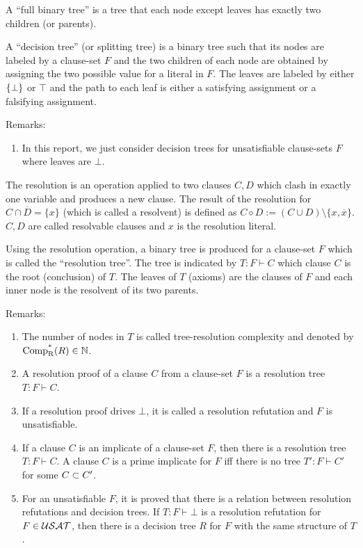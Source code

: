 \documentclass{report}
\begin{document}
A ``full binary tree'' is a tree that each node except leaves has exactly two children (or parents). 
\begin{defi}\label{def:decs-tree}
A ``decision tree'' (or splitting tree) is a binary tree such that its nodes are labeled by a clause-set $F$ and the two children of each node are obtained by assigning the two possible value for a literal in $F$. The leaves are labeled by either $\{ \bot \}$ or $\top$ and the path to each leaf is either a satisfying assignment or a falsifying assignment.
\end{defi}
Remarks:
  \begin{enumerate}
  \item  In this report, we just consider decision trees for unsatisfiable clause-sets $F$ where leaves are $\bot$.
  \end{enumerate}

\begin{defi}\label{def:resolution}
The resolution is an operation applied to two clauses $C,D$ which clash in exactly one variable and produces a new clause. The result of the resolution for $C \cap \overline D = \{ x \}$ (which is called a resolvent) is defined as $C \diamond D := (C \cup D) \setminus \{x, \overline x\} $. $C,D$ are called resolvable clauses and $x$ is the resolution literal. 
\end{defi}
\begin{defi}\label{def:resolution-tree}
Using the resolution operation, a binary tree is produced for a clause-set $F$ which is called the ``resolution tree''. The tree is indicated by $T : F \vdash C$ which clause $C$ is the root (conclusion) of $T$. The leaves of $T$ (axioms) are the clauses of $F$ and each inner node is the resolvent of its two parents. 
\end{defi}
Remarks:
  \begin{enumerate}
  \item  The number of nodes in $T$ is called tree-resolution complexity and denoted by $\operatorname{\operatorname{Comp}_{R}^*}(R) \in \mathbb{N}$.
  \item  A resolution proof of a clause $C$ from a clause-set $F$ is a resolution tree $T : F \vdash C$.
  \item  If a resolution proof drives $\bot$, it is called a resolution refutation and $F$ is unsatisfiable.
  \item If a clause $C$ is an implicate of a clause-set $F$, then there is a resolution tree $T : F \vdash C$. A clause $C$ is a prime implicate for $F$ iff there is no tree $T': F \vdash C'$ for some $C \subset C'$.
  \item For an unsatisfiable $F$, it is proved that there is a relation between resolution refutations and decision trees. If $T : F \vdash \bot$ is a resolution refutation for $F \in \mathcal{USAT}$, then there is a decision tree $R$ for $F$ with the same structure of $T$.
  \end{enumerate}
\end{document}

